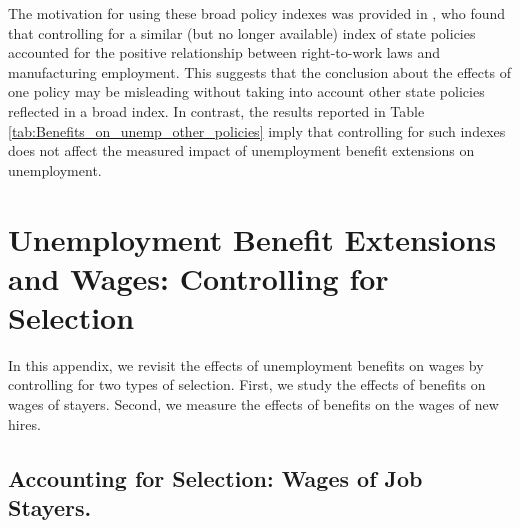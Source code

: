\documentclass[12pt]{article}
\newcommand{\1}{\mathbf{1}}
\begin{document}
\begin{appendix}
%

The motivation for using these broad policy indexes was provided in \citet{holmes:98}, who found that controlling for a similar (but no longer available) index of state policies accounted for the positive relationship between right-to-work laws and manufacturing employment. This suggests that the conclusion about the effects of one policy may be misleading without taking into account other state policies reflected in a broad index. In contrast, the results reported in Table \ref{tab:Benefits_on_unemp_other_policies} imply that controlling for such indexes does not affect the measured impact of unemployment benefit extensions on unemployment.



\section{Unemployment Benefit Extensions and Wages: Controlling for Selection}
\label{app:wages}

In this appendix, we revisit the effects of unemployment benefits on wages by controlling for two types of selection. First, we study the effects of benefits on wages of stayers. Second, we measure the effects of benefits on the wages of new hires.

\subsection{Accounting for Selection: Wages of Job Stayers.} 


\end{appendix}
\end{document}

